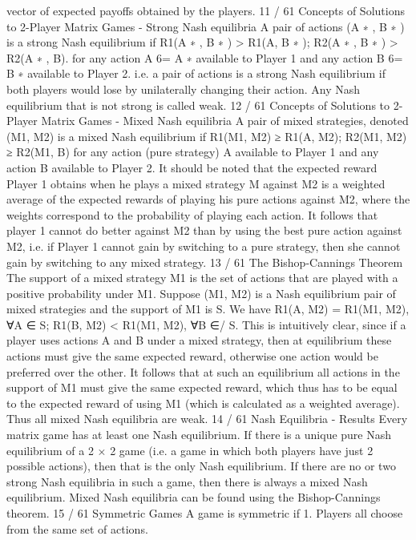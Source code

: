 vector of expected payoffs obtained by the players.
11 / 61
Concepts of Solutions to 2-Player Matrix Games - Strong
Nash equilibria
A pair of actions (A
∗
, B
∗
) is a strong Nash equilibrium if
R1(A
∗
, B
∗
) > R1(A, B
∗
); R2(A
∗
, B
∗
) > R2(A
∗
, B).
for any action A 6= A
∗
available to Player 1 and any action B 6= B
∗
available to Player 2.
i.e. a pair of actions is a strong Nash equilibrium if both players
would lose by unilaterally changing their action.
Any Nash equilibrium that is not strong is called weak.
12 / 61
Concepts of Solutions to 2-Player Matrix Games - Mixed
Nash equilibria
A pair of mixed strategies, denoted (M1, M2) is a mixed Nash
equilibrium if
R1(M1, M2) ≥ R1(A, M2); R2(M1, M2) ≥ R2(M1, B)
for any action (pure strategy) A available to Player 1 and any
action B available to Player 2.
It should be noted that the expected reward Player 1 obtains when
he plays a mixed strategy M against M2 is a weighted average of
the expected rewards of playing his pure actions against M2, where
the weights correspond to the probability of playing each action.
It follows that player 1 cannot do better against M2 than by using
the best pure action against M2, i.e. if Player 1 cannot gain by
switching to a pure strategy, then she cannot gain by switching to
any mixed strategy.
13 / 61
The Bishop-Cannings Theorem
The support of a mixed strategy M1 is the set of actions that are
played with a positive probability under M1.
Suppose (M1, M2) is a Nash equilibrium pair of mixed strategies
and the support of M1 is S. We have
R1(A, M2) = R1(M1, M2), ∀A ∈ S; R1(B, M2) < R1(M1, M2), ∀B ∈/ S.
This is intuitively clear, since if a player uses actions A and B
under a mixed strategy, then at equilibrium these actions must give
the same expected reward, otherwise one action would be preferred
over the other.
It follows that at such an equilibrium all actions in the support of
M1 must give the same expected reward, which thus has to be
equal to the expected reward of using M1 (which is calculated as a
weighted average). Thus all mixed Nash equilibria are weak.
14 / 61
Nash Equilibria - Results
Every matrix game has at least one Nash equilibrium.
If there is a unique pure Nash equilibrium of a 2 × 2 game (i.e. a
game in which both players have just 2 possible actions), then that
is the only Nash equilibrium.
If there are no or two strong Nash equilibria in such a game, then
there is always a mixed Nash equilibrium.
Mixed Nash equilibria can be found using the Bishop-Cannings
theorem.
15 / 61
Symmetric Games
A game is symmetric if
1. Players all choose from the same set of actions.
